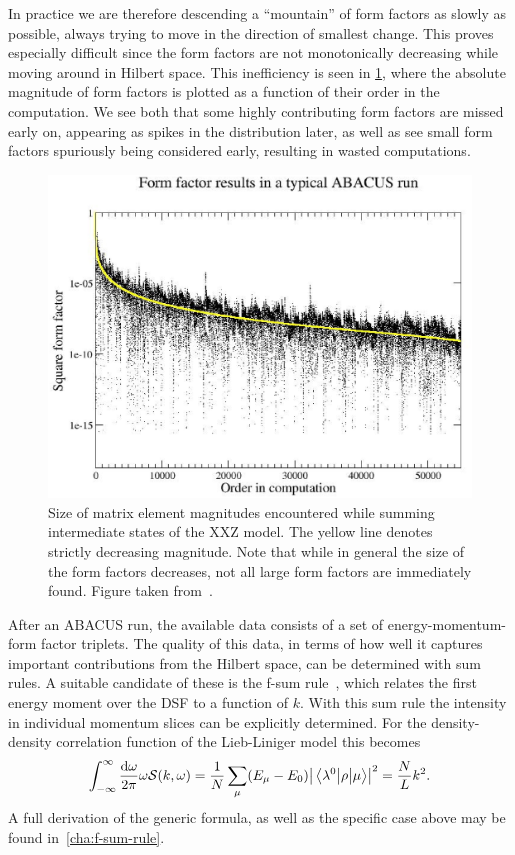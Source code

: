\documentclass[11pt, a4paper]{report} %
\begin{document}
In practice we are therefore descending a ``mountain'' of form factors as slowly as possible, always trying to move in the direction of smallest change.
This proves especially difficult since the form factors are not monotonically decreasing while moving around in Hilbert space.
This inefficiency is seen in \cref{fig:orderedmagnitudes}, where the absolute magnitude of form factors is plotted as a function of their order in the computation.
We see both that some highly contributing form factors are missed early on, appearing as spikes in the distribution later, as well as see small form factors spuriously being considered early, resulting in wasted computations.
\begin{figure}[tb!]
  \centering
  \includegraphics[width=\textwidth]{FFsq_vs_order_D0p6N50M20_small}
  \caption{Size of matrix element magnitudes encountered while summing intermediate states of the XXZ model. The yellow line denotes strictly decreasing magnitude. Note that while in general the size of the form factors decreases, not all large form factors are immediately found. Figure taken from~\cite{Caux2009}.}
\label{fig:orderedmagnitudes}
\end{figure}

After an ABACUS run, the available data consists of a set of energy-momentum-form factor triplets.
The quality of this data, in terms of how well it captures important contributions from the Hilbert space, can be determined with sum rules.
A suitable candidate of these is the f-sum rule~\cite{Caux2007a}, which relates the first energy moment over the DSF to a function of \(k\).
With this sum rule the intensity in individual momentum slices can be explicitly determined.
For the density-density correlation function of the Lieb-Liniger model this becomes
\begin{align}
  \label{eq:fsumrule}
  \int_{-\infty}^{\infty} \frac{\dd \omega}{2\pi} \omega \mathcal{S}(k, \omega) = \frac{1}{N}\sum_{\mu}(E_{\mu}-E_0)\abs{\mel{\lambda^0}{\rho}{\mu}}^2  = \frac{N}{L} k^2.
\end{align}
A full derivation of the generic formula, as well as the specific case above may be found in~\cref{cha:f-sum-rule}. 
\end{document}
